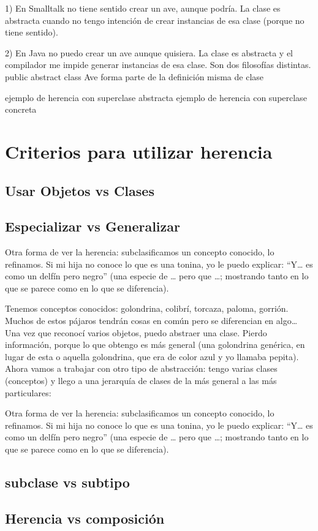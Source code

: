 \documentclass[a4paper,12pt]{book}
\begin{document}
1) En Smalltalk no tiene sentido crear un ave, aunque podría. La clase es abstracta
cuando no tengo intención de crear instancias de esa clase (porque no tiene sentido).

2) En Java no puedo crear un ave aunque quisiera. La clase es abstracta y el compilador
me impide generar instancias de esa clase. Son dos filosofías distintas.
public abstract class Ave forma parte de la definición misma de clase

ejemplo de herencia con superclase abstracta
ejemplo de herencia con superclase concreta

\section{Criterios para utilizar herencia}
\subsection{Usar Objetos vs Clases}
\subsection{Especializar vs Generalizar}

Otra forma de ver la herencia: subclasificamos un concepto conocido, lo refinamos. Si mi hija
no conoce lo que es una tonina, yo le puedo explicar: “Y… es como un delfín pero negro” (una
especie de … pero que …; mostrando tanto en lo que se parece como en lo que se diferencia). 

Tenemos conceptos conocidos: golondrina, colibrí, torcaza, paloma, gorrión. Muchos de estos
pájaros tendrán cosas en común pero se diferencian en algo…
Una vez que reconocí varios objetos, puedo abstraer una clase. Pierdo información, porque lo
que obtengo es más general (una golondrina genérica, en lugar de esta o aquella golondrina,
que era de color azul y yo llamaba pepita).
Ahora vamos a trabajar con otro tipo de abstracción: tengo varias clases (conceptos) y llego a
una jerarquía de clases de la más general a las más particulares: 

Otra forma de ver la herencia: subclasificamos un concepto conocido, lo refinamos. Si mi hija
no conoce lo que es una tonina, yo le puedo explicar: “Y… es como un delfín pero negro” (una
especie de … pero que …; mostrando tanto en lo que se parece como en lo que se diferencia).

\subsection{subclase vs subtipo}
\subsection{Herencia vs composición}

  
\end{document}
